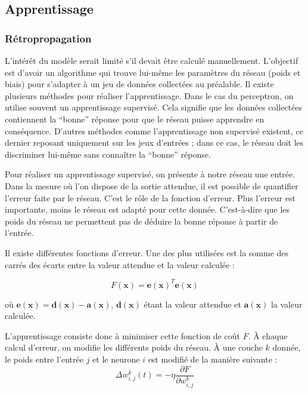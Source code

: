 \subsection{Apprentissage}

\subsubsection{Rétropropagation}

L'intérêt du modèle serait limité s'il devait être calculé manuellement. L'objectif est d'avoir un algorithme qui trouve lui-même les paramètres du réseau
(poids et biais) pour s'adapter à un jeu de données collectées au préalable. Il existe plusieurs méthodes pour réaliser l'apprentissage. Dans le cas du 
perceptron, on utilise souvent un apprentissage supervisé. Cela signifie que les données collectées contiennent la ``bonne'' réponse pour que 
le réseau puisse apprendre en conséquence. D'autres méthodes comme l'apprentissage non supervisé existent, ce dernier reposant uniquement sur les jeux 
d'entrées ; dans ce cas, le réseau doit les discriminer lui-même sans connaître la ``bonne'' réponse.

Pour réaliser un apprentissage supervisé, on présente à notre réseau une entrée. Dans la mesure où l'on dispose de la sortie attendue, il est possible de quantifier l'erreur faite par le réseau.
C'est le rôle de la fonction d'erreur. Plus l'erreur est importante, moins le réseau est adapté pour cette donnée. C'est-à-dire que les poids du réseau ne permettent pas de déduire la bonne réponse à partir de l'entrée.

Il existe différentes fonctions d'erreur. Une des plus utilisées est la somme des carrés des écarts entre la valeur attendue et la valeur calculée :

\begin{equation}
\displaystyle F\left(\mathbf{x}\right) = \mathbf{e\left(x\right)}^T\mathbf{e\left(x\right)} 
\end{equation}

où $\displaystyle \mathbf{e\left(x\right)} = \mathbf{d\left(x\right)} - \mathbf{a\left(x\right)} $,
$\mathbf{d\left(x\right)}$ étant la valeur attendue et $\mathbf{a\left(x\right)}$ la valeur calculée.


L'apprentissage consiste donc à minimiser cette fonction de coût $F$. À chaque calcul d'erreur, on modifie les différents poids du réseau.
À une couche $k$ donnée, le poids entre l'entrée $j$ et le neurone $i$ est modifié de la manière suivante : 
\begin{equation}
 \Delta w^k_{i,j}\left(t\right) = - \eta \frac{\partial F}{\partial w^k_{i,j}}
\end{equation}
 
